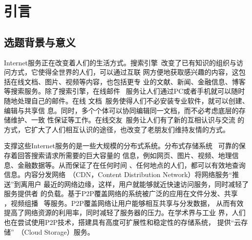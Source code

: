 \chapter{引言}
\label{chap:intro}

\section{选题背景与意义}




Internet服务正在改变着人们的生活方式。搜索引擎~\cite{google, yahoo,
baidu}改变了已有知识的组织与访问方式，它使得全世界的人们，可以通过互联
网方便地获取感兴趣的内容，这包括在线文档、图片、视频等内容，也包括更专
业的文献、新闻、金融信息、博客等搜索服务。除了搜索引擎，在线邮件~
\cite{gmail}服务让人们通过PC或者手机就可以随时随地处理自己的邮件。在线
文档~\cite{gdoc}服务使得人们不必安装专业软件，就可以创建、编辑与共享信
息。同时，多个个体可以协同编辑同一文档，而不必考虑底层的存储维护、一致
性保证等工作。在线交友~\cite{facebook}服务让人们有了新的互相认识与交流
的方式，它扩大了人们相互认识的途径，也改变了老朋友们维持友情的方式。


支撑这些Internet服务的是一些大规模的分布式系统。分布式存储系统~
\cite{gfs, bigtable, dynamo}可靠的保存着回答搜索请求所需要的巨大容量的
信息，例如网页、图片、视频、地理信息、金融数据等。从而保证了在任何时间
、任何地点的人们，都可以有效地查询信息。内容分发网络~\cite{akamai,
coral}（CDN，Content Distribution Network）将网络服务“推送”到离用户
最近的网络边缘，这样，用户就能够就近快速访问服务，同时减轻了服务提供者
的负载。基于P2P覆盖网络的系统被广泛的应用在文件分发、共享~
\cite{bittorrent, sharkfs}，视频组播~ \cite{chainsaw, coolstreaming,
bullet, splitstream}等服务。P2P覆盖网络让用户能够相互共享与分发数据，
从而有效提高了网络资源的利用率，同时减轻了服务器的压力。在学术界与工业
界，人们也在尝试使用P2P技术，搭建具有高度可扩展性和稳定性的存储系统，
提供“云存储”~\cite{s3, idisk}（Cloud Storage）服务。

